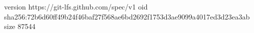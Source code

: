 version https://git-lfs.github.com/spec/v1
oid sha256:72b6d60ff49b24f46baf27f568ae6bd2692f1753d3ae9099a4017ed3d23ea3ab
size 87544
